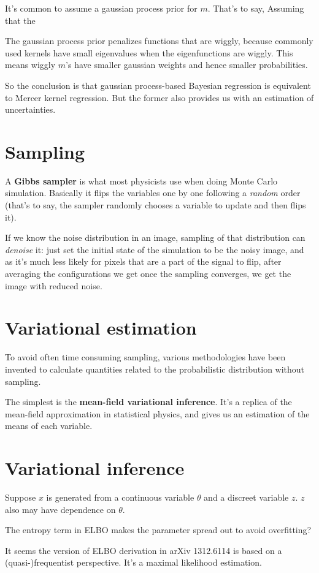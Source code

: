 \documentclass[hyperref, a4paper]{article}
\newcommand*{\concept}[1]{{\textbf{#1}}}
\begin{document}
It's common to assume a gaussian process prior for $m$.
That's to say,
Assuming that the 

The gaussian process prior penalizes functions that are wiggly,
because commonly used kernels have small eigenvalues when the eigenfunctions are wiggly.
This means wiggly $m$'s have smaller gaussian weights and hence smaller probabilities.

So the conclusion is that gaussian process-based Bayesian regression is equivalent to Mercer kernel regression.
But the former also provides us with an estimation of uncertainties.

\section{Sampling}

A \concept{Gibbs sampler} is what most physicists use when doing Monte Carlo simulation.
Basically it flips the variables one by one following a \emph{random} order
(that's to say, the sampler randomly chooses a variable to update and then flips it).

If we know the noise distribution in an image,
sampling of that distribution can \emph{denoise} it:
just set the initial state of the simulation to be the noisy image,
and as it's much less likely for pixels that are a part of the signal to flip,
after averaging the configurations we get once the sampling converges,
we get the image with reduced noise.

\section{Variational estimation}

To avoid often time consuming sampling,
various methodologies have been invented to calculate quantities related to the probabilistic distribution without sampling.

The simplest is the \concept{mean-field variational inference}.
It's a replica of the mean-field approximation in statistical physics,
and gives us an estimation of the means of each variable.

\section{Variational inference}

Suppose $x$ is generated from a continuous variable $\theta$ and a discreet variable $z$.
$z$ also may have dependence on $\theta$.

The entropy term in ELBO makes the parameter spread out to avoid overfitting?

It seems the version of ELBO derivation in arXiv 1312.6114 
is based on a (quasi-)frequentist perspective.
It's a maximal likelihood estimation. 
\end{document}
